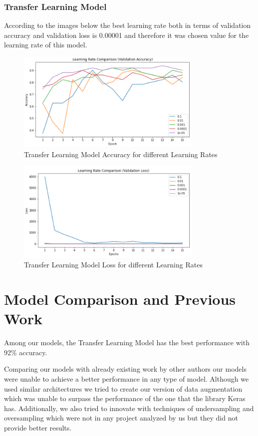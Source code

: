 \documentclass[conference]{IEEEtran}
\begin{document}
\subsubsection{Transfer Learning Model}

According to the images below the best learning rate both in terms of validation accuracy and validation loss is 0.00001 and therefore it was chosen value for the learning rate of this model.

\begin{figure}[H]
    \centering
    \includegraphics[width=3.5in]{transferl_learning_rate_val_accuracy.PNG}
    \caption{Transfer Learning Model Accuracy for different Learning Rates}\label{fig:fig20}
\end{figure}

\begin{figure}[H]
    \centering
    \includegraphics[width=3.5in]{transferl_learning_rate_val_loss.PNG}
    \caption{Transfer Learning Model Loss for different Learning Rates}\label{fig:fig21}
\end{figure}

\section{Model Comparison and Previous Work}

Among our models, the Transfer Learning Model has the best performance with 92\% accuracy.

Comparing our models with already existing work by other authors our models were unable to achieve a better performance in any type of model. Although we used similar architectures we tried to create our version of data augmentation which was unable to surpass the performance of the one that the library Keras has. Additionally, we also tried to innovate with techniques of undersampling and oversampling which were not in any project analyzed by us but they did not provide better results.
\end{document}
